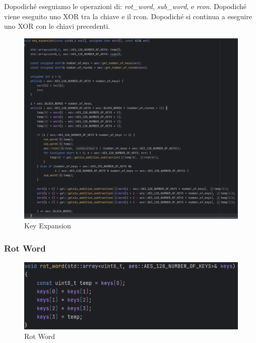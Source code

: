    

\textsf{\small Dopodiché eseguiamo le operazioni di: \emph{rot\_word}, \emph{sub\_word}, e \emph{rcon}. Dopodiché viene eseguito uno XOR tra la chiave e il rcon. Dopodiché si continua a eseguire uno XOR con le chiavi precedenti.}


\begin{figure}[H]
	\centering
	\includegraphics[width=1\textwidth, height=1\textheight, keepaspectratio]{./images/code/cpp/key_expansion/key_expansion.PNG}
	\caption{Key Expansion}
	\label{fig:key_expansion_code}
\end{figure}

\subsubsection{Rot Word}

\begin{figure}[H]
	\centering
	\includegraphics[width=1\textwidth, height=1\textheight, keepaspectratio]{./images/code/cpp/key_expansion/rot_word.PNG}
	\caption{Rot Word}
	\label{fig:rot_word}
\end{figure}

